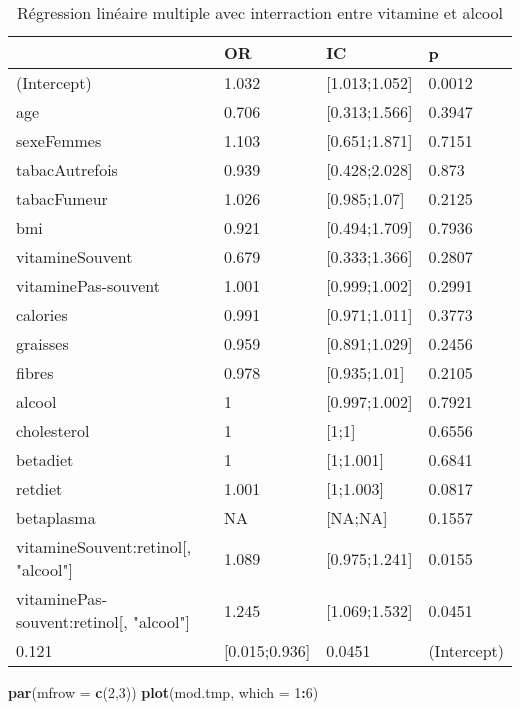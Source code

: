 \documentclass[]{article}
\newenvironment{Shaded}{\begin{snugshade}}{\end{snugshade}}
\newcommand{\KeywordTok}[1]{\textcolor[rgb]{0.13,0.29,0.53}{\textbf{#1}}}
\newcommand{\DataTypeTok}[1]{\textcolor[rgb]{0.13,0.29,0.53}{#1}}
\newcommand{\DecValTok}[1]{\textcolor[rgb]{0.00,0.00,0.81}{#1}}
\newcommand{\OperatorTok}[1]{\textcolor[rgb]{0.81,0.36,0.00}{\textbf{#1}}}
\newcommand{\NormalTok}[1]{#1}
\begin{document}
\begin{table}

\caption{\label{tab:unnamed-chunk-87}Régression linéaire multiple avec interraction entre vitamine et alcool}
\centering
\begin{tabular}[t]{l|l|l|l}
\hline
  & OR & IC & p\\
\hline
\rowcolor[HTML]{BBD2E1}  (Intercept) & 1.032 & [1.013;1.052] & 0.0012\\
\hline
age & 0.706 & [0.313;1.566] & 0.3947\\
\hline
\rowcolor[HTML]{BBD2E1}  sexeFemmes & 1.103 & [0.651;1.871] & 0.7151\\
\hline
tabacAutrefois & 0.939 & [0.428;2.028] & 0.873\\
\hline
\rowcolor[HTML]{BBD2E1}  tabacFumeur & 1.026 & [0.985;1.07] & 0.2125\\
\hline
bmi & 0.921 & [0.494;1.709] & 0.7936\\
\hline
\rowcolor[HTML]{BBD2E1}  vitamineSouvent & 0.679 & [0.333;1.366] & 0.2807\\
\hline
vitaminePas-souvent & 1.001 & [0.999;1.002] & 0.2991\\
\hline
\rowcolor[HTML]{BBD2E1}  calories & 0.991 & [0.971;1.011] & 0.3773\\
\hline
graisses & 0.959 & [0.891;1.029] & 0.2456\\
\hline
\rowcolor[HTML]{BBD2E1}  fibres & 0.978 & [0.935;1.01] & 0.2105\\
\hline
alcool & 1 & [0.997;1.002] & 0.7921\\
\hline
\rowcolor[HTML]{BBD2E1}  cholesterol & 1 & [1;1] & 0.6556\\
\hline
betadiet & 1 & [1;1.001] & 0.6841\\
\hline
\rowcolor[HTML]{BBD2E1}  retdiet & 1.001 & [1;1.003] & 0.0817\\
\hline
betaplasma & NA & [NA;NA] & 0.1557\\
\hline
\rowcolor[HTML]{BBD2E1}  vitamineSouvent:retinol[, "alcool"] & 1.089 & [0.975;1.241] & 0.0155\\
\hline
vitaminePas-souvent:retinol[, "alcool"] & 1.245 & [1.069;1.532] & 0.0451\\
\hline
\rowcolor[HTML]{BBD2E1}  0.121 & [0.015;0.936] & 0.0451 & (Intercept)\\
\hline
\end{tabular}
\end{table}

\begin{Shaded}
\begin{Highlighting}[]
\KeywordTok{par}\NormalTok{(}\DataTypeTok{mfrow =} \KeywordTok{c}\NormalTok{(}\DecValTok{2}\NormalTok{,}\DecValTok{3}\NormalTok{))}
\KeywordTok{plot}\NormalTok{(mod.tmp, }\DataTypeTok{which =} \DecValTok{1}\OperatorTok{:}\DecValTok{6}\NormalTok{)}
\end{Highlighting}
\end{Shaded}
\end{document}
